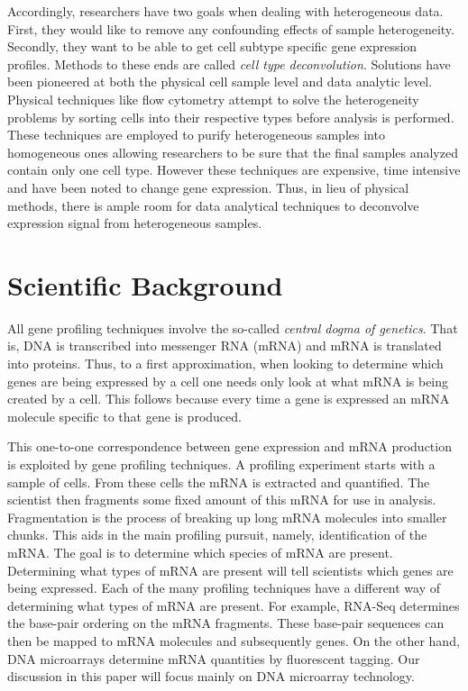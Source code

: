 \documentclass[reqno,12pt,oneside]{report}\usepackage[]{graphicx}\usepackage[]{color}
\theoremstyle{plain}
\theoremstyle{definition}
\theoremstyle{remark}
\numberwithin{theorem}{chapter}     %
\begin{document}
Accordingly, researchers have two goals when dealing with heterogeneous data. First, they would like to remove any confounding effects of sample heterogeneity. Secondly, they want to be able to get cell subtype specific gene expression profiles. Methods to these ends are called \emph{cell type deconvolution}. Solutions have been pioneered at both the physical cell sample level and data analytic level. Physical techniques like flow cytometry attempt to solve the heterogeneity problems by sorting cells into their respective types before analysis is performed. These techniques are employed to purify heterogeneous samples into homogeneous ones allowing researchers to be sure that the final samples analyzed contain only one cell type. However these techniques are expensive, time intensive and have been noted to change gene expression. Thus, in lieu of physical methods, there is ample room for data analytical techniques to deconvolve expression signal from heterogeneous samples. 

 

 \chapter{Scientific Background}
 \label{chap:Science}

All gene profiling techniques involve the so-called \emph{central dogma of genetics}. That is, DNA is transcribed into messenger RNA (mRNA) and mRNA is translated into proteins. Thus, to a first approximation, when looking to determine which genes are being expressed by a cell one needs only look at what mRNA is being created by a cell. This follows because every time a gene is expressed an mRNA molecule specific to that gene is produced.

This one-to-one correspondence between gene expression and mRNA production is exploited by gene profiling techniques. A profiling experiment starts with a sample of cells. From these cells the mRNA is extracted and quantified. The scientist then fragments some fixed amount of this mRNA for use in analysis. Fragmentation is the process of breaking up long mRNA molecules into smaller chunks. This aids in the main profiling pursuit, namely, identification of the mRNA. The goal is to determine which species of mRNA are present. Determining what types of mRNA are present will tell scientists which genes are being expressed. Each of the many profiling techniques have a different way of determining what types of mRNA are present. For example, RNA-Seq determines the base-pair ordering on the mRNA fragments. These base-pair sequences can then be mapped to mRNA molecules and subsequently genes. On the other hand, DNA microarrays determine mRNA quantities by fluorescent tagging. Our discussion in this paper will focus mainly on DNA microarray technology.
\end{document}
